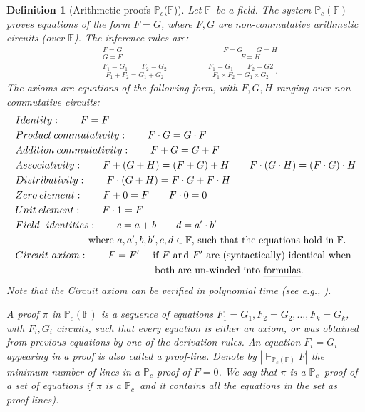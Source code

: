 \documentclass[12pt,reqno]{article}
\newtheorem{definition}{Definition}
\newcommand\F{\ensuremath{\mathbb F}}
\newcommand\PP{{\mathbb P}}
\newcommand\PC{\ensuremath{\PP_c}}
\begin{document}
\begin{definition}[Arithmetic proofs \PC(\F)]\label{def:arithmetic_proofs}
Let \F\ be a field. The system $\PC(\F)$ proves equations of the form $F = G$, where $F, G$ are
non-commutative arithmetic circuits (over \F). The inference rules are:
\begin{align*}
&\frac{F = G}{G = F} \qquad\qquad \qquad\qquad \qquad
\frac{F = G \qquad G = H}
{F = H}\\
&\frac{ F_1= G_1\qquad F_2= G_2}{F_1+F_2= G_1+G_2} \qquad\qquad
\frac{F_1= G_1\qquad F_2= G2}{F_1 \times F_2= G_1 \times G_2}
\,.
\end{align*}
The axioms are equations of the following form, with $F, G, H$ ranging over non-commutative circuits:
\begin{align*}
&Identity: \qquad F=F\\
&Product \: commutativity:  \qquad F\cdot G= G\cdot F\\
&Addition\: commutativity: \qquad F+G=G+F\\
&Associativity:\qquad   F+(G+H)=(F+G)+H \qquad F\cdot(G\cdot H)=(F\cdot G)\cdot H\\
&Distributivity:\qquad F\cdot(G+H)=F\cdot G+F\cdot H\\
&Zero \:element: \qquad F+0=F \qquad F\cdot 0=0\\
&Unit \:element:\qquad F\cdot 1 =F \\
&Field\ ~identities: \qquad c=a+b \qquad d= a'\cdot b'\\
&~~~~~~~~~~~~~~~~~~~~~~\text{where $a,a',b,b',c,d\in \F$, such that the equations hold in $\F$.} \\
&Circuit \ axiom:\qquad F=F'
\text{~~~~if $F$ and $F'$ are (syntactically) identical when} \\
&~~~~~~~~~~~~~~~~~~~~~~~~~~~~~~~~~~~~~~~~~~\text{both are un-winded into \emph{formulas}.}
\end{align*}
Note that the Circuit axiom can be verified in polynomial time (see e.g., \cite{Jer04}).

A proof $\pi$ in $\PC(\F)$ is a sequence of equations $F_1= G_1, F_2= G_2, \ldots, F_k= G_k$, with $F_i, G_i$ circuits, such that every equation is either an axiom, or was obtained from previous equations by one of the derivation rules.
An equation $F_i= G_i$ appearing in a proof is also called a \textit{proof-line}. Denote by $|\vdash_{\PC(\F)}F|$  the minimum number of lines in a $\PC$ proof of   $F=0$. We say that $\pi$ is a \PC\ proof of \textit{a set} of equations if $\pi$ is a \PC\ and it contains all the equations in the set as proof-lines).
\end{definition}
\end{document}
